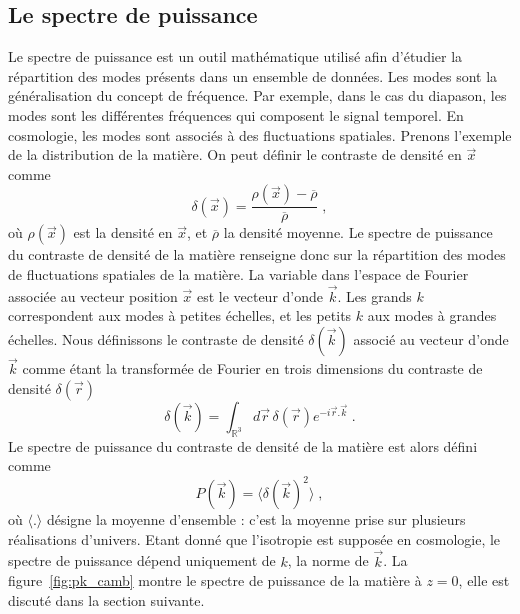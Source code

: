 \subsection{Le spectre de puissance}
Le spectre de puissance est un outil mathématique utilisé afin d'étudier la répartition des modes présents dans un ensemble de données. Les modes sont la généralisation du concept de fréquence. Par exemple, dans le cas du diapason, les modes sont les différentes fréquences qui composent le signal temporel. En cosmologie, les modes sont associés à des fluctuations spatiales. Prenons l'exemple de la distribution de la matière. On peut définir le contraste de densité en $\vec x$ comme
\begin{equation}
  \label{eq:contraste}
  \delta(\vec x) = \frac{\rho(\vec x) - \overline \rho}{\overline\rho}  \; ,
\end{equation}
où $\rho(\vec x)$ est la densité en $\vec x$, et $\overline \rho$ la densité moyenne. Le spectre de puissance du contraste de densité de la matière renseigne donc sur la répartition des modes de fluctuations spatiales de la matière. La variable dans l'espace de Fourier associée au vecteur position $\vec x$ est le vecteur d'onde $\vec k$. Les grands $k$ correspondent aux modes à petites échelles, et les petits $k$ aux modes à grandes échelles.
Nous définissons le contraste de densité $\delta(\vec k)$ associé au vecteur d'onde $\vec k$ comme étant la transformée de Fourier en trois dimensions du contraste de densité $\delta(\vec r)$
\begin{equation}
  \label{eq:delta_k}
  \delta(\vec k) = \int_{\mathbb{R}^{3}} d\vec r \,\delta(\vec r) e^{-i \vec r . \vec k} \; .
\end{equation}
Le spectre de puissance du contraste de densité de la matière est alors défini comme
\begin{equation}
  \label{eq:def_pow_spec}
  P(\vec{k}) = \langle \delta(\vec k)^{2} \rangle  \; ,
\end{equation}
où $\langle . \rangle$ désigne la moyenne d'ensemble : c'est la moyenne prise sur plusieurs réalisations d'univers.
Etant donné que l'isotropie est supposée en cosmologie, le spectre de puissance dépend uniquement de $k$, la norme de $\vec{k}$. La figure~\ref{fig:pk_camb} montre le spectre de puissance de la matière à $z=0$, elle est discuté dans la section suivante.

